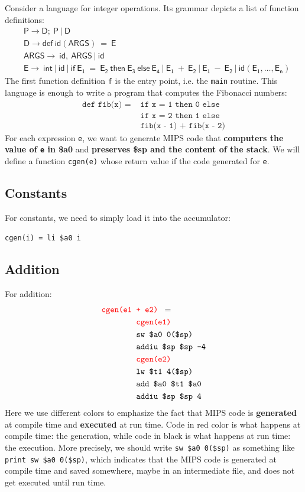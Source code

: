 Consider a language for integer operations. Its grammar depicts a list of function definitions:
\begin{align*}
&\mathsf{P\rightarrow D;\:P\:|\:D}\\
&\mathsf{D\rightarrow def\:id(ARGS)\:=\:E}\\
&\mathsf{ARGS\rightarrow\:id,\:ARGS\:|\:id}\\
&\mathsf{E\rightarrow\:int\:|\:id\:|\:if\:E_1\:=\:E_2\:then\:E_3\:else\:E_4\:|\:E_1\:+\:E_2\:|\:E_1\:-\:E_2\:|\:id(E_1,\dots,E_n)}
\end{align*}
The first function definition \texttt{f} is the entry point, i.e. the \texttt{main} routine. This language is enough to write a program that computes the Fibonacci numbers:
\begin{equation}\label{fibonacci}\begin{split}
\texttt{def fib(x) = }&\texttt{if x = 1 then 0 else}\\
&\texttt{if x = 2 then 1 else}\\
&\texttt{fib(x - 1) + fib(x - 2)}
\end{split}\end{equation}
For each expression \texttt{e}, we want to generate MIPS code that \textbf{computers the value of \texttt{e} in \$a0} and \textbf{preserves \$sp and the content of the stack}. We will define a function \texttt{cgen(e)} whose return value if the code generated for \texttt{e}.

\subsection{Constants}
For constants, we need to simply load it into the accumulator:
\begin{center}
\texttt{\color{red}cgen(i)}\texttt{ = li \$a0 i}
\end{center}
\subsection{Addition}
For addition:
\begin{align*}
\texttt{\color{red}cgen(e1 }&\texttt{\color{red}+ e2) }=\\
&\texttt{\color{red}cgen(e1)}\\
&\texttt{sw \$a0 0(\$sp)}\\
&\texttt{addiu \$sp \$sp -4}\\
&\texttt{\color{red} cgen(e2)}\\
&\texttt{lw \$t1 4(\$sp)}\\
&\texttt{add \$a0 \$t1 \$a0}\\
&\texttt{addiu \$sp \$sp 4}
\end{align*}
Here we use different colors to emphasize the fact that MIPS code is \textbf{generated} at compile time and \textbf{executed} at run time. Code in red color is what happens at compile time: the generation, while code in black is what happens at run time: the execution. More precisely, we should write \texttt{sw \$a0 0(\$sp)} as something like \texttt{{\color{red}print} sw \$a0 0(\$sp)}, which indicates that the MIPS code is generated at compile time and saved somewhere, maybe in an intermediate file, and does not get executed until run time.

